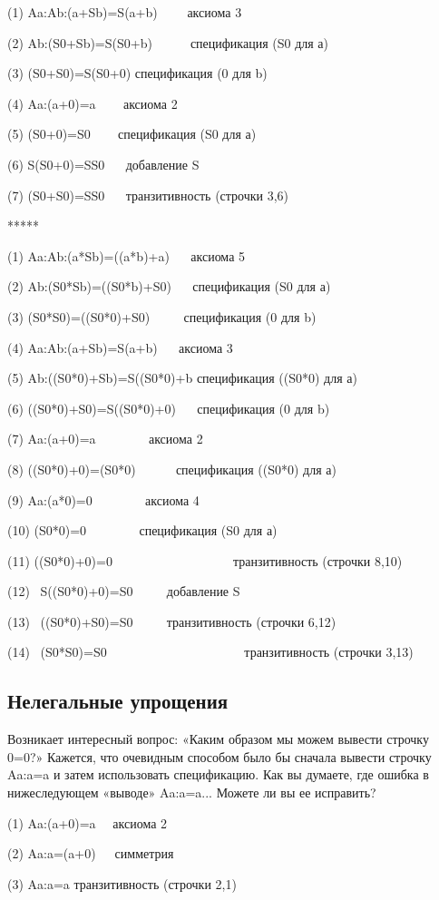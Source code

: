 \documentclass[../main.tex]{subfiles}
\begin{document}
(1) Aa:Ab:(a+Sb)=S(a+b)~~~~ аксиома 3

(2) Ab:(S0+Sb)=S(S0+b)~~~~~~спецификация (S0 для а)

(3) (S0+S0)=S(S0+0) спецификация (0 для b)

(4) Aa:(a+0)=a ~~~ аксиома 2

(5) (S0+0)=S0 ~~~ спецификация (S0 для а)

(6) S(S0+0)=SS0 ~~ добавление S

(7) (S0+S0)=SS0 ~~ транзитивность (строчки 3,6)

*****

(1) Aa:Ab:(a*Sb)=((a*b)+a) ~~ аксиома 5

(2) Ab:(S0*Sb)=((S0*b)+S0) ~~ спецификация (S0 для а)

(3) (S0*S0)=((S0*0)+S0) ~~~~ спецификация (0 для b)

(4) Aa:Ab:(a+Sb)=S(a+b) ~~ аксиома 3

(5) Ab:((S0*0)+Sb)=S((S0*0)+b спецификация ((S0*0) для а)

(6) ((S0*0)+S0)=S((S0*0)+0) ~~ спецификация (0 для b)

(7) Aa:(a+0)=a ~~~~~~~ аксиома 2

(8) ((S0*0)+0)=(S0*0) ~~~~~ спецификация ((S0*0) для а)

(9) Aa:(a*0)=0 ~~~~~~~ аксиома 4

(10) (S0*0)=0 ~~~~~~~ спецификация (S0 для а)

(11) ((S0*0)+0)=0~~~~~~~~~~~~~~~~~~~транзитивность (строчки 8,10)

(12)~ S((S0*0)+0)=S0 ~~~~ добавление S

(13)~ ((S0*0)+S0)=S0 ~~~~ транзитивность (строчки 6,12)

(14)~ (S0*S0)=S0~~~~~~~~~~~~~~~~~~~~~ транзитивность (строчки 3,13)


\subsection{Нелегальные упрощения}

Возникает интересный вопрос: «Каким образом мы можем вывести строчку 0=0?» Кажется, что очевидным способом было бы сначала вывести строчку Aa:a=a и затем использовать спецификацию. Как вы думаете, где ошибка в нижеследующем «выводе» Aa:a=a... Можете ли вы ее исправить?

(1) Aa:(a+0)=a ~~аксиома 2

(2) Aa:a=(a+0)~~~симметрия

(3) Aa:a=a транзитивность (строчки 2,1)
\end{document}

